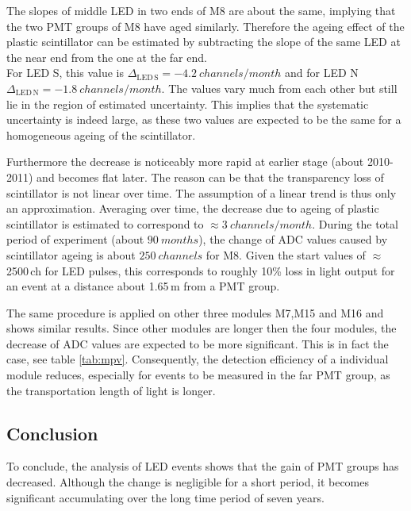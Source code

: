 The slopes of middle LED in two ends of M8 are about the same, implying that the two PMT groups of M8 have aged similarly. Therefore the ageing effect of the plastic scintillator can be estimated by subtracting the slope of the same LED at the near end from the one at the far end. \\
For LED S, this value is $\Delta{}_{\mathrm{LED\,S}}=\SI{-4.2}{channels\per month}$ and for LED N $\Delta{}_{\mathrm{LED \,N}}=\SI{-1.8}{channels\per month}$. The values vary much from each other but still lie in the region of estimated uncertainty. This implies that the systematic uncertainty is indeed large, as these two values are expected to be the same for a homogeneous ageing of the scintillator.

Furthermore the decrease is noticeably more rapid at earlier stage (about 2010-2011) and becomes flat later. The reason can be that the transparency loss of scintillator is not linear over time. The assumption of a linear trend is thus only an approximation.
Averaging over time, the decrease due to ageing of plastic scintillator is estimated to correspond to  $\approx \SI{3}{channels\per month}$. During the total period of experiment (about $\SI{90}{months}$), the change of ADC values caused by scintillator ageing is about $\SI{250}{channels}$ for M8. Given the start values of $\approx$2500\,ch for LED pulses, this corresponds to roughly 10\% loss in light output for an event at a distance about 1.65\,m from a PMT group.

The same procedure is applied on other three modules M7,M15 and M16 and shows similar results. Since other modules are longer then the four modules, the decrease of ADC values are expected to be more significant. This is in fact the case, see table \ref{tab:mpv}. Consequently, the detection efficiency of a individual module reduces, especially for events to be measured in the far PMT group, as the transportation length of light is longer.

\subsection{Conclusion}

To conclude, the analysis of LED events shows that the gain of PMT groups has decreased. Although the change is negligible for a short period, it becomes significant accumulating over the long time period of seven years.

